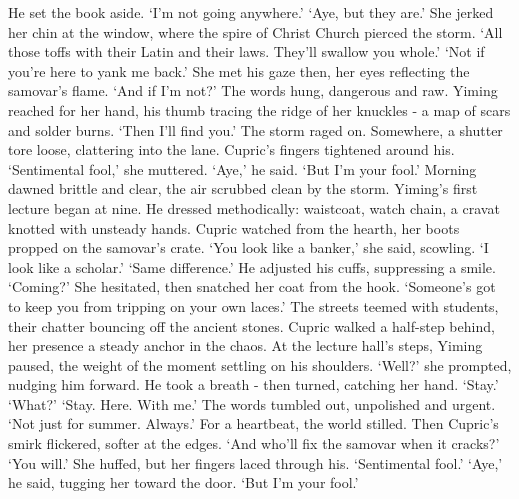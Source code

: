 He set the book aside. `I'm not going anywhere.'
`Aye, but they are.' She jerked her chin at the window, where the spire of Christ Church pierced the storm. `All those toffs with their Latin and their laws. They'll swallow you whole.'
`Not if you're here to yank me back.'
She met his gaze then, her eyes reflecting the samovar's flame. `And if I'm not?'
The words hung, dangerous and raw. Yiming reached for her hand, his thumb tracing the ridge of her knuckles - a map of scars and solder burns. `Then I'll find you.'
The storm raged on. Somewhere, a shutter tore loose, clattering into the lane. Cupric's fingers tightened around his.
`Sentimental fool,' she muttered.
`Aye,' he said. `But I'm your fool.'
Morning dawned brittle and clear, the air scrubbed clean by the storm. Yiming's first lecture began at nine. He dressed methodically: waistcoat, watch chain, a cravat knotted with unsteady hands. Cupric watched from the hearth, her boots propped on the samovar's crate.
`You look like a banker,' she said, scowling.
`I look like a scholar.'
`Same difference.'
He adjusted his cuffs, suppressing a smile. `Coming?'
She hesitated, then snatched her coat from the hook. `Someone's got to keep you from tripping on your own laces.'
The streets teemed with students, their chatter bouncing off the ancient stones. Cupric walked a half-step behind, her presence a steady anchor in the chaos. At the lecture hall's steps, Yiming paused, the weight of the moment settling on his shoulders.
`Well?' she prompted, nudging him forward.
He took a breath - then turned, catching her hand. `Stay.'
`What?'
`Stay. Here. With me.' The words tumbled out, unpolished and urgent. `Not just for summer. Always.'
For a heartbeat, the world stilled. Then Cupric's smirk flickered, softer at the edges. `And who'll fix the samovar when it cracks?'
`You will.'
She huffed, but her fingers laced through his. `Sentimental fool.'
`Aye,' he said, tugging her toward the door. `But I'm your fool.'